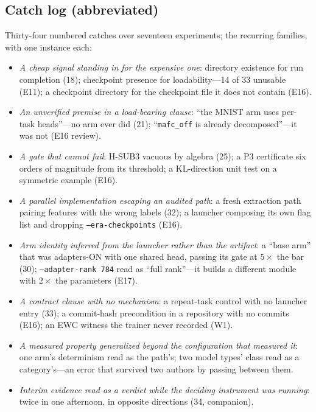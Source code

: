 \subsection{Catch log (abbreviated)}

Thirty-four numbered catches over seventeen experiments; the recurring
families, with one instance each:
\begin{itemize}\setlength\itemsep{1pt}
\item \emph{A cheap signal standing in for the expensive one}: directory
  existence for run completion (18); checkpoint presence for loadability---14
  of 33 unusable (E11); a checkpoint directory for the checkpoint file it does
  not contain (E16).
\item \emph{An unverified premise in a load-bearing clause}: ``the MNIST arm
  uses per-task heads''---no arm ever did (21); ``\texttt{mafc\_off} is already
  decomposed''---it was not (E16 review).
\item \emph{A gate that cannot fail}: H-SUB3 vacuous by algebra (25); a P3
  certificate six orders of magnitude from its threshold; a KL-direction unit
  test on a symmetric example (E16).
\item \emph{A parallel implementation escaping an audited path}: a fresh
  extraction path pairing features with the wrong labels (32); a launcher
  composing its own flag list and dropping \texttt{--era-checkpoints} (E16).
\item \emph{Arm identity inferred from the launcher rather than the artifact}:
  a ``base arm'' that was adapters-ON with one shared head, passing its gate at
  $5\times$ the bar (30); \texttt{--adapter-rank 784} read as ``full rank''---it
  builds a different module with $2\times$ the parameters (E17).
\item \emph{A contract clause with no mechanism}: a repeat-task control with no
  launcher entry (33); a commit-hash precondition in a repository with no
  commits (E16); an EWC witness the trainer never recorded (W1).
\item \emph{A measured property generalized beyond the configuration that
  measured it}: one arm's determinism read as the path's; two model types' class
  read as a category's---an error that survived two authors by passing between
  them.
\item \emph{Interim evidence read as a verdict while the deciding instrument
  was running}: twice in one afternoon, in opposite directions (34, companion).
\end{itemize}

